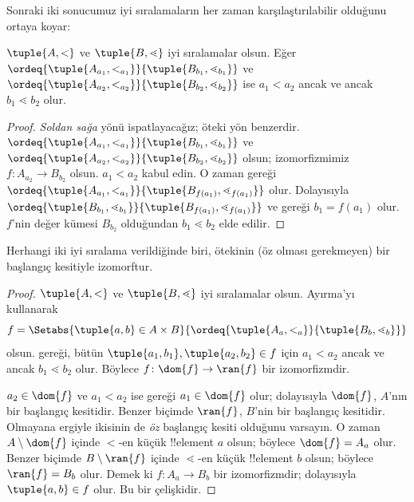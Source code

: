 \documentclass[../../../include/open-logic-section]{subfiles}
\begin{document}
Sonraki iki sonucumuz iyi sıralamaların her zaman karşılaştırılabilir
olduğunu ortaya koyar:

\begin{lem}
$\tuple{A,<}$ ve $\tuple{B,\lessdot}$ iyi sıralamalar olsun. Eğer
$\ordeq{\tuple{A_{a_1},<_{a_1}}}{\tuple{B_{b_1},\lessdot_{b_1}}}$ ve
$\ordeq{\tuple{A_{{a_2}},<_{a_2}}}{\tuple{B_{{b_2}},
\lessdot_{b_2}}}$ ise ${a_1}<{a_2}$ ancak ve ancak
${b_1}\lessdot{b_2}$ olur.
\end{lem}

\begin{proof}
\emph{Soldan sağa} yönü ispatlayacağız; öteki yön benzerdir.
$\ordeq{\tuple{A_{a_1},<_{a_1}}}{\tuple{B_{b_1},\lessdot_{b_1}}}$ ve
$\ordeq{\tuple{A_{{a_2}},<_{a_2}}}{\tuple{B_{{b_2}},\lessdot_{b_2}}}$
olsun; izomorfizmimiz $f\colon A_{{a_2}}\to B_{{b_2}}$ olsun.
${a_1}<{a_2}$ kabul edin. O zaman
 gereği
$\ordeq{\tuple{A_{a_1},<_{a_1}}}{\tuple{B_{f({a_1})},
\lessdot_{f({a_1})}}}$ olur. Dolayısıyla
$\ordeq{\tuple{B_{b_1},\lessdot_{b_1}}}{\tuple{B_{f({a_1})},
\lessdot_{f({a_1})}}}$ ve  gereği
${b_1}=f({a_1})$ olur. $f$'nin değer kümesi $B_{{b_2}}$ olduğundan
${b_1}\lessdot{b_2}$ elde edilir.
\end{proof}

\begin{thm}
Herhangi iki iyi sıralama verildiğinde biri, ötekinin (öz olması gerekmeyen)
bir başlangıç kesitiyle izomorftur.
\end{thm}

\begin{proof}
$\tuple{A,<}$ ve $\tuple{B,\lessdot}$ iyi sıralamalar olsun. Ayırma'yı
kullanarak
\[
	f = \Setabs{\tuple{a, b} \in A \times B}{
		\ordeq{\tuple{A_a, <_a}}{\tuple{B_b, \lessdot_b}}}
\]
olsun.  gereği, bütün
$\tuple{a_1,b_1},\tuple{a_2,b_2}\in f$ için $a_1<a_2$ ancak ve ancak
$b_1\lessdot b_2$ olur. Böylece
$f\colon\dom{f}\to\ran{f}$ bir izomorfizmdir.

$a_2\in\dom{f}$ ve $a_1<a_2$ ise
 gereği $a_1\in\dom{f}$ olur; dolayısıyla
$\dom{f}$, $A$'nın bir başlangıç kesitidir. Benzer biçimde $\ran{f}$,
$B$'nin bir başlangıç kesitidir. Olmayana ergiyle ikisinin de \emph{öz}
başlangıç kesiti olduğunu varsayın. O zaman $A\setminus\dom{f}$ içinde
$<$-en küçük !!{element} $a$ olsun; böylece $\dom{f}=A_a$ olur. Benzer
biçimde $B\setminus\ran{f}$ içinde $\lessdot$-en küçük !!{element} $b$
olsun; böylece $\ran{f}=B_b$ olur. Demek ki
$f\colon A_a\to B_b$ bir izomorfizmdir; dolayısıyla
$\tuple{a,b}\in f$ olur. Bu bir çelişkidir.
\end{proof}
\end{document}
